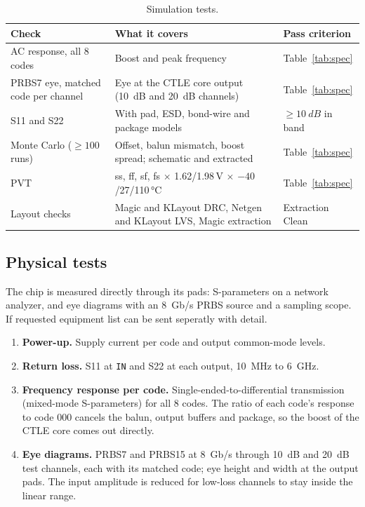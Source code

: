 \documentclass[11pt,a4paper]{article}
\newcommand{\pin}[1]{\texttt{#1}}
\begin{document}
\begin{table}[h]
\centering\small
\caption{Simulation tests.}
\begin{tabularx}{\linewidth}{@{}l L l@{}}
\toprule
Check & What it covers & Pass criterion \\
\midrule
AC response, all 8 codes & Boost and peak frequency & Table~\ref{tab:spec} \\
PRBS7 eye, matched code per channel & Eye at the CTLE core output (\SI{10}{dB} and \SI{20}{dB} channels) & Table~\ref{tab:spec} \\
S11 and S22 & With pad, ESD, bond-wire and package models & $\geq\SI{10}{dB}$ in band \\
Monte Carlo ($\geq 100$ runs) & Offset, balun mismatch, boost spread; schematic and extracted & Table~\ref{tab:spec} \\
PVT & ss, ff, sf, fs $\times$ 1.62/1.98\,V $\times$ $-40$/27/110\,\si{\celsius} & Table~\ref{tab:spec} \\
Layout checks & Magic and KLayout DRC, Netgen and KLayout LVS, Magic extraction & Extraction Clean \\
\bottomrule
\end{tabularx}
\end{table}

\subsection{Physical tests}

The chip is measured directly through its pads: S-parameters on a network
analyzer, and eye diagrams with an \SI{8}{Gb/s} PRBS source and a sampling
scope. If requested equipment list can be sent seperatly with detail.

\begin{enumerate}
\item \textbf{Power-up.} Supply current per code and output common-mode levels.
\item \textbf{Return loss.} S11 at \pin{IN} and S22 at each output,
  \SI{10}{MHz} to \SI{6}{GHz}.
\item \textbf{Frequency response per code.} Single-ended-to-differential
  transmission (mixed-mode S-parameters) for all 8 codes. The ratio of each
  code's response to code 000 cancels the balun, output buffers and
  package, so the boost of the CTLE core comes out directly.
\item \textbf{Eye diagrams.} PRBS7 and PRBS15 at \SI{8}{Gb/s} through
  \SI{10}{dB} and \SI{20}{dB} test channels, each with its matched code; eye
  height and width at the output pads. The input amplitude is reduced for
  low-loss channels to stay inside the linear range.
\end{enumerate}
\end{document}
